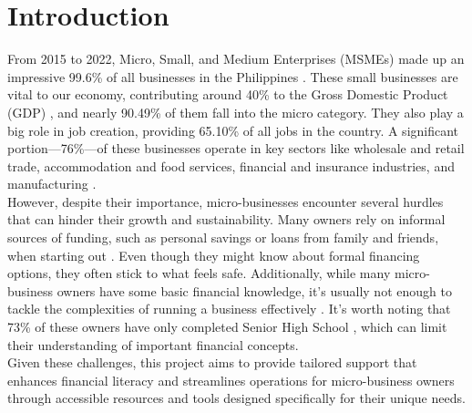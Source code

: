 \documentclass{article}
\begin{document}
\section{Introduction}



From 2015 to 2022, Micro, Small, and Medium Enterprises (MSMEs) made up an impressive 99.6\% of all businesses in the Philippines \parencite{department_of_trade_and_industry_philippines_msme_2022, ibarra_accounting_2015}. These small businesses are vital to our economy, contributing around 40\% to the Gross Domestic Product (GDP) \parencite{united_nations_development_program_msme_2020}, and nearly 90.49\% of them fall into the micro category. They also play a big role in job creation, providing 65.10\% of all jobs in the country. A significant portion—76\%—of these businesses operate in key sectors like wholesale and retail trade, accommodation and food services, financial and insurance industries, and manufacturing \parencite{philippine_statistics_authority_2018_2018}. \\

However, despite their importance, micro-businesses encounter several hurdles that can hinder their growth and sustainability. Many owners rely on informal sources of funding, such as personal savings or loans from family and friends, when starting out \parencite{almeda_micro_2012}. Even though they might know about formal financing options, they often stick to what feels safe. Additionally, while many micro-business owners have some basic financial knowledge, it’s usually not enough to tackle the complexities of running a business effectively \parencite{ibarra_accounting_2015}. It’s worth noting that 73\% of these owners have only completed Senior High School \parencite{rahmawati_analysis_2015}, which can limit their understanding of important financial concepts. \\
Given these challenges, this project aims to provide tailored support that enhances financial literacy and streamlines operations for micro-business owners through accessible resources and tools designed specifically for their unique needs.
\end{document}
